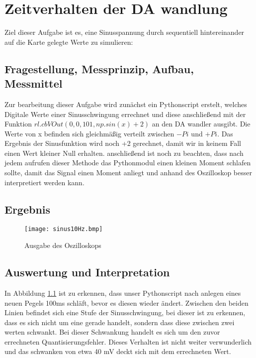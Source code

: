 %
%
\chapter{Zeitverhalten der DA wandlung}
Ziel dieser Aufgabe ist es, eine Sinusspannung durch sequentiell hintereinander auf die Karte gelegte Werte zu simulieren:
\label{chap:ZeitverhaltenDA}
\section{Fragestellung, Messprinzip, Aufbau, Messmittel}
\label{chap:VERSUCH_2_FRAGESTELLUNG}
Zur bearbeitung dieser Aufgabe wird zunächst ein Pythonscript erstelt, welches Digitale Werte einer Sinusschwingung errechnet und diese anschließend mit der Funktion $rl.cbVOut(0,0,101,np.sin(x)+2)$ an den DA wandler ausgibt. Die Werte von x befinden sich gleichmäßig verteilt zwischen $-Pi$ und $+Pi$. Das Ergebnis der Sinusfunktion wird noch +2 gerechnet, damit wir in keinem Fall einen Wert kleiner Null erhalten. anschließend ist noch zu beachten, dass nach jedem aufrufen dieser Methode das Pythonmodul einen kleinen Moment schlafen sollte, damit das Signal einen Moment anliegt und anhand des Oszilloskop besser interpretiert werden kann.
\section{Ergebnis}
\label{chap:VERSUCH_4_MESSWERTE}

\begin{figure}[H]
\centering
\texttt{[image: sinus10Hz.bmp]}
\caption{Ausgabe des Oszilloskops}
\label{fig:Oszi}
\end{figure}


\section{Auswertung und Interpretation}
\label{chap:AUSWERTUNGUNDINTERPRETATION}
In Abbildung \ref{fig:Oszi} ist zu erkennen, dass unser Pythonscript nach anlegen eines neuen Pegels 100ms schläft, bevor es diesen wieder ändert.
Zwischen den beiden Linien befindet sich eine Stufe der Sinusschwingung, bei dieser ist zu erkennen, dass es sich nicht um eine  gerade handelt, sondern dass diese zwischen zwei werten schwankt. Bei dieser Schwankung handelt es sich um den zuvor errechneten Quantisierungsfehler. Dieses Verhalten ist nicht weiter verwunderlich und das schwanken von etwa 40 mV deckt sich mit dem errechneten Wert.
